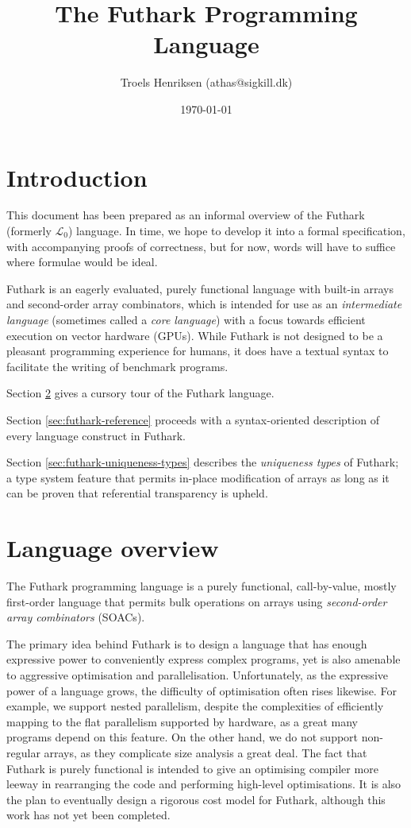 \documentclass[oneside]{memoir}
\title{The Futhark Programming Language}
\date{\today}
\author{Troels Henriksen (athas@sigkill.dk)}
\newcommand{\LO}{$\mathcal{L}_0$}
\begin{document}
\maketitle

\section{Introduction}

This document has been prepared as an informal overview of the Futhark
(formerly \LO{}) language.  In time, we hope to develop it into a
formal specification, with accompanying proofs of correctness, but for
now, words will have to suffice where formulae would be ideal.

Futhark is an eagerly evaluated, purely functional language with built-in
arrays and second-order array combinators, which is intended for use
as an \emph{intermediate language} (sometimes called a \emph{core
  language}) with a focus towards efficient execution on vector
hardware (GPUs).  While Futhark is not designed to be a pleasant
programming experience for humans, it does have a textual syntax to
facilitate the writing of benchmark programs.

Section \ref{sec:futhark-overview} gives a cursory tour of the Futhark language.

Section \ref{sec:futhark-reference} proceeds with a syntax-oriented
description of every language construct in Futhark.

Section \ref{sec:futhark-uniqueness-types} describes the \emph{uniqueness
  types} of Futhark; a type system feature that permits in-place
modification of arrays as long as it can be proven that referential
transparency is upheld.

\section{Language overview}
\label{sec:futhark-overview}

The Futhark programming language is a purely functional, call-by-value,
mostly first-order language that permits bulk operations on arrays
using \textit{second-order array combinators} (SOACs).

The primary idea behind Futhark is to design a language that has enough
expressive power to conveniently express complex programs, yet is also
amenable to aggressive optimisation and parallelisation.
Unfortunately, as the expressive power of a language grows, the
difficulty of optimisation often rises likewise.  For example, we
support nested parallelism, despite the complexities of efficiently
mapping to the flat parallelism supported by hardware, as a great many
programs depend on this feature.  On the other hand, we do not support
non-regular arrays, as they complicate size analysis a great deal.
The fact that Futhark is purely functional is intended to give an
optimising compiler more leeway in rearranging the code and performing
high-level optimisations.  It is also the plan to eventually design a
rigorous cost model for Futhark, although this work has not yet been
completed.
\end{document}
